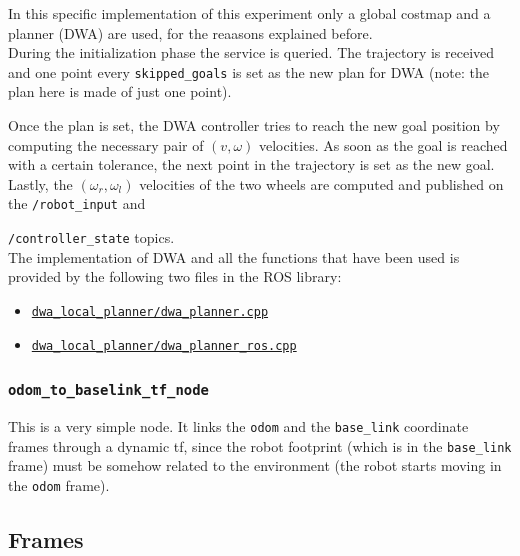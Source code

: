 \documentclass[11pt,a4paper]{article}
\begin{document}
In this specific implementation of this experiment only a global costmap and a planner (DWA) are used,
for the reaasons explained before.\\

During the initialization phase the service is queried.
The trajectory is received and one point every \texttt{skipped\_goals} is set as the new plan for DWA
(note: the plan here is made of just one point).

Once the plan is set, the DWA controller tries to reach the new goal position by computing the necessary
pair of $(v, \omega)$ velocities. As soon as the goal is reached with a certain tolerance, the next point
in the trajectory is set as the new goal.\\

Lastly, the $(\omega_r,\omega_l)$ velocities of the two wheels are computed and published on the
\texttt{/robot\_input} and

\texttt{/controller\_state} topics.\\

The implementation of DWA and all the functions that have been used is provided by the following
two files in the ROS library:
\begin{itemize}
    \item \href{https://docs.ros.org/en/melodic/api/dwa\_local\_planner/html/dwa\_\_planner\_8cpp\_source.html}
            {\texttt{dwa\_local\_planner/dwa\_planner.cpp}}
    \item \href{https://docs.ros.org/en/melodic/api/dwa\_local\_planner/html/dwa\_\_planner\_\_ros\_8cpp\_source.html}
            {\texttt{dwa\_local\_planner/dwa\_planner\_ros.cpp}}
\end{itemize}

\subsubsection{\texttt{odom\_to\_baselink\_tf\_node}}

This is a very simple node. It links the \texttt{odom} and the \texttt{base\_link}
coordinate frames through a dynamic tf, since the robot footprint (which is in the \texttt{base\_link}
frame) must be somehow related to the environment (the robot starts moving in the \texttt{odom} frame).



\subsection{Frames}
\end{document}
